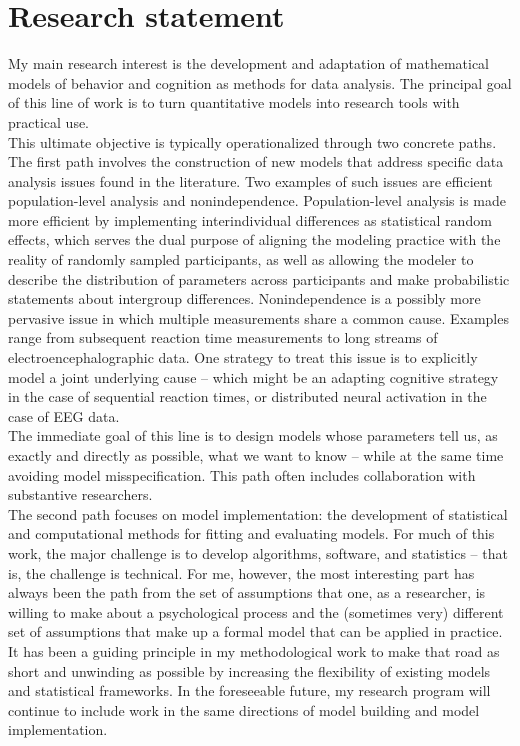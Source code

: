 \newpage
\null
{}

\section*{Research statement}
\noindent My main research interest is the development and adaptation of mathematical models of behavior and cognition as methods for data analysis. The principal goal of this line of work is to turn quantitative models into research tools with practical use.\\

\noindent This ultimate objective is typically operationalized through two concrete paths. The first path involves the construction of new models that address specific data analysis issues found in the literature. Two examples of such issues are efficient population-level analysis and nonindependence. Population-level analysis is made more efficient by implementing interindividual differences as statistical random effects, which serves the dual purpose of aligning the modeling practice with the reality of randomly sampled participants, as well as allowing the modeler to describe the distribution of parameters across participants and make probabilistic statements about intergroup differences. Nonindependence is a possibly more pervasive issue in which multiple measurements share a common cause. Examples range from subsequent reaction time measurements to long streams of electroencephalographic data. One strategy to treat this issue is to explicitly model a joint underlying cause -- which might be an adapting cognitive strategy in the case of sequential reaction times, or distributed neural activation in the case of EEG data.\\

\noindent The immediate goal of this line is to design models whose parameters tell us, as exactly and directly as possible, what we want to know -- while at the same time avoiding model misspecification. This path often includes collaboration with substantive researchers.\\

\noindent The second path focuses on model implementation: the development of statistical and computational methods for fitting and evaluating models. For much of this work, the major challenge is to develop algorithms, software, and statistics -- that is, the challenge is technical. For me, however, the most interesting part has always been the path from the set of assumptions that one, as a researcher, is willing to make about a psychological process and the (sometimes very) different set of assumptions that make up a formal model that can be applied in practice. It has been a guiding principle in my methodological work to make that road as short and unwinding as possible by increasing the flexibility of existing models and statistical frameworks. In the foreseeable future, my research program will continue to include work in the same directions of model building and model implementation.\\

